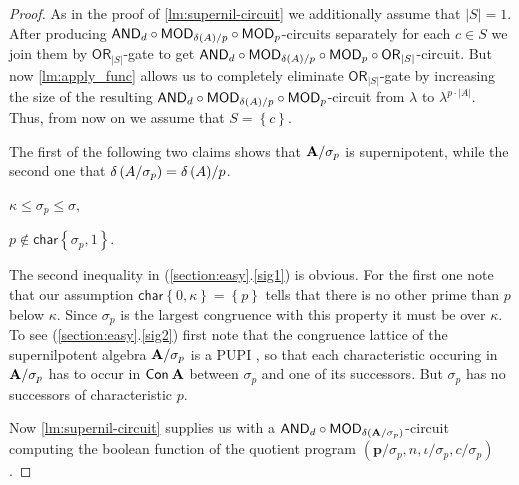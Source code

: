 \documentclass[11pt,a4paper]{amsart}
\newcounter{senumi}[section]
\newcounter{senumip}[section]
\newcounter{temp}[section]
\def\thesenumi{\thesection.\arabic{senumip}}
\newenvironment{senumerate}{\begin{list}{\hspace{-2em}(\thesenumi)}{\usecounter{senumip}}
\setcounter{senumip}{\value{temp}}
    }{\setcounter{temp}{\value{senumip}}
     \end{list}}
\newcommand{\m}[1]{{\uppercase {\bf{#1}}}}
\newcommand{\set}[1]{{\left\{ {#1} \right\} }}
\newcommand{\card}[1]{\left| #1 \right|}
\renewcommand{\leq}{\leqslant}
\newcommand{\con}[1]{{\sf Con\:\m{#1}}}
\newcommand{\po}[1]{{\mathbf {#1}}}
\newcounter{note}
\newcounter{claim}
\newcommand{\pupi}{PUPI }
\newcommand{\charr}{\mathsf{char}}
\newcommand{\charrset}[1]{\charr\set{#1}}
\newcommand{\progg}[4]{\left(#1,#2,#3,#4\right)}
\newcommand{\ccc}{c}    \newcommand{\s}{s}
\newcommand{\csize}{\lambda}
\newcommand{\ccand}{\mathsf{AND}}
\newcommand{\ccmod}{\mathsf{MOD}}
\newcommand{\ccor}{\mathsf{OR}}
\newcommand{\pdiv}[1]{\ppdiv\left(#1\right)}    \newcommand{\ar}[1]{\mu\left({#1}\right)}       \newcommand{\maxar}[1]{\mu\left({\m #1}\right)}
\begin{document}
\begin{proof}
As in the proof of \cref{lm:supernil-circuit} we additionally assume that $\card S =1$.
After producing $\ccand_d\circ\ccmod_{\pdiv A/p}\circ\ccmod_p$-circuits
separately for each $\ccc \in S$ we join them by $\ccor_{\card S}$-gate
to get $\ccand_d\circ\ccmod_{\pdiv A/p}\circ\ccmod_p\circ\ccor_{\card S}$-circuit.
But now \cref{lm:apply_func} allows us to completely eliminate $\ccor_{\card S}$-gate
by increasing the size of the resulting $\ccand_d\circ\ccmod_{\pdiv A/p}\circ\ccmod_p$-circuit
from $\csize$ to $\csize^{p\cdot|A|}$.
Thus, from now on we assume that $S=\set{\ccc}$.

The first of the following two claims shows that $\m A/\sigma_p$ is supernipotent,
while the second one that $\pdiv{A/\sigma_p}=\pdiv{A}\!/p$.
\begin{senumerate}
\item
\label{sig1}
$\kappa\leq\sigma_p\leq\sigma$,
\item
\label{sig2}
$p\not\in\charrset{\sigma_p,1}$.
\end{senumerate}
The second inequality in (\ref{section:easy}.\ref{sig1}) is obvious.
For the first one note that our assumption $\charrset{0,\kappa}=\set{p}$ tells that there is no other prime than $p$ below $\kappa$. Since $\sigma_p$ is the largest congruence with this property
it must be over $\kappa$.
To see (\ref{section:easy}.\ref{sig2}) first note that the congruence lattice of the supernilpotent algebra $\m A/\sigma_p$ is a \pupi,
so that each characteristic occuring in $\m A/\sigma_p$
has to occur in $\con{\m A}$ between $\sigma_p$ and one of its successors.
But $\sigma_p$ has no successors of characteristic $p$.

\medskip

Now \cref{lm:supernil-circuit} supplies us with a
$\ccand_d\circ\ccmod_{\pdiv{\m A/\sigma_p}}$-circuit
computing the boolean function
of the quotient program $\progg{\po p/\sigma_p}{n}{\iota/\sigma_p}{\ccc/\sigma_p}$.


\end{proof}
\end{document}

